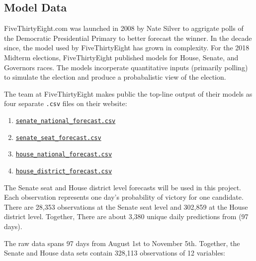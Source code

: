 \documentclass[]{article}
\providecommand{\tightlist}{%
  \setlength{\itemsep}{0pt}\setlength{\parskip}{0pt}}
\begin{document}
\subsection{Model Data}\label{model-data}

FiveThirtyEight.com was launched in 2008 by Nate Silver to aggrigate
polls of the Democratic Presidential Primary to better forecast the
winner. In the decade since, the model used by FiveThirtyEight has grown
in complexity. For the 2018 Midterm elections, FiveThirtyEight published
models for House, Senate, and Governors races. The models incorperate
quantitative inputs (primarily polling) to simulate the election and
produce a probabalistic view of the election.

The team at FiveThirtyEight makes public the top-line output of their
models as four separate \texttt{.csv} files on their website:

\begin{enumerate}
\def\labelenumi{\arabic{enumi}.}
\tightlist
\item
  \href{https://projects.fivethirtyeight.com/congress-model-2018/senate_national_forecast.csv}{\texttt{senate\_national\_forecast.csv}}
\item
  \href{https://projects.fivethirtyeight.com/congress-model-2018/senate_seat_forecast.csv}{\texttt{senate\_seat\_forecast.csv}}
\item
  \href{https://projects.fivethirtyeight.com/congress-model-2018/house_national_forecast.csv}{\texttt{house\_national\_forecast.csv}}
\item
  \href{https://projects.fivethirtyeight.com/congress-model-2018/house_district_forecast.csv}{\texttt{house\_district\_forecast.csv}}
\end{enumerate}

The Senate seat and House district level forecasts will be used in this
project. Each observation represents one day's probability of victory
for one candidate. There are 28,353 observations at the Senate seat
level and 302,859 at the House district level. Together, There are about
3,380 unique daily predictions from (97 days).

The raw data spans 97 days from August 1st to November 5th. Together,
the Senate and House data sets contain 328,113 observations of 12
variables:
\end{document}
